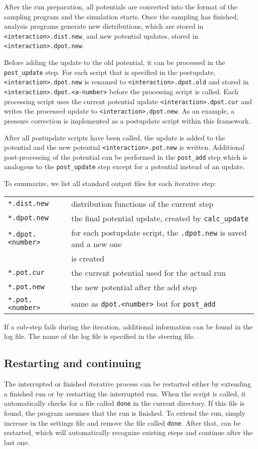 After the run preparation, all potentials are converted into the format of the sampling program and the simulation starts. Once the sampling has finished, analysis programs generate new distributions, which are stored in \texttt{<interaction>.dist.new}, and new potential updates, stored in \texttt{<interaction>.dpot.new}. 

Before adding the update to the old potential, it can be processed in the \texttt{post\_update} step. For each script that is specified in the postupdate, \texttt{<interaction>.dpot.new} is renamed  to \texttt{<interaction>.dpot.old} and stored in \texttt{<interaction>.dpot.<a-number>} before the processing script is called. Each processing script  uses the current potential update \texttt{<interaction>.dpot.cur} and writes the processed update to \texttt{<interaction>.dpot.new}. As an example, a pressure correction is implemented as a postupdate script within this framework.

After all postupdate scripts have been called, the update is added to the potential and the new potential \texttt{<interaction>.pot.new} is written. Additional post-processing of the potential can be performed in the \texttt{post\_add} step which is analogous to the \texttt{post\_update} step except for a potential instead of an update.

To summarize, we list all standard output files for each iterative step:

\begin{tabular}{ll}
\texttt{*.dist.new} & distribution functions of the current step \\
\texttt{*.dpot.new} & the final potential update, created by \texttt{calc\_update} \\
\texttt{*.dpot.<number>} & for each postupdate script, the \texttt{.dpot.new} is saved and a new one\\
&is created\\
\texttt{*.pot.cur} & the current potential used for the actual run\\
\texttt{*.pot.new} & the new potential after the add step \\
\texttt{*.pot.<number>} & same as \texttt{dpot.<number>} but for \texttt{post\_add}
\end{tabular}

If a sub-step fails during the iteration, additional information can be found in the log file. The name of the log file is specified in the steering \xml file.

\subsection{Restarting and continuing}
The interrupted or finished iterative process can be restarted either by extending a finished run or by restarting the interrupted run. When the script  is called, it automatically checks for a file called \texttt{done} in the current directory. If this file is found, the program assumes that the run is finished. To extend the run, simply increase  in the settings file and remove the file called \texttt{done}. After that,  can be restarted, which will automatically recognize existing steps and continue after the last one.

